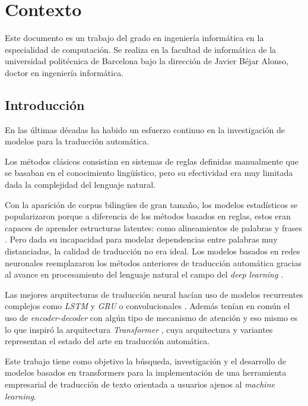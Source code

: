 \chapter{Contexto}
Este documento es un trabajo del grado en ingeniería informática en la especialidad
de computación. Se realiza en la facultad de informática de la universidad politécnica
de Barcelona bajo la dirección de Javier Béjar Alonso, doctor en ingeniería informática.

\section{Introducción}\label{intro}
En las últimas décadas ha habido un esfuerzo continuo en la investigación de modelos para la traducción
automática.

Los métodos clásicos consistian en sistemas de reglas definidas manualmente que se
basaban en el conocimiento lingüístico, pero su efectividad era muy limitada dada la complejidad del lenguaje
natural.

Con la aparición de corpus bilingües de gran tamaño, los modelos estadísticos se popularizaron
porque a diferencia de los métodos basados en reglas, estos eran capaces de aprender
estructuras latentes: como alineamientos de palabras y frases
\cite{HistoryBrown1990ASA, HistoryKoehn2003Jan}. Pero dada su incapacidad para
modelar dependencias entre palabras muy distanciadas, la calidad de traducción no era ideal.
Los modelos basados en redes neuronales \cite{Historykalchbrenner-blunsom-2013, HistoryCho2014Jun,
HistorySutskever2014Sep, HistoryBahdanau2014Sep} reemplazaron los métodos anteriores de
traducción automática gracias al avance en procesamiento del lenguaje natural el campo
del \textit{deep learning} \cite{HistoryTan2020Dec}.

Las mejores arquitecturas de traducción neural hacían uso de modelos recurrentes complejos como
\textit{LSTM} \cite{HistoryHochreiter1997} y \textit{GRU} \cite{HistoryChung2014Dec} o
convolucionales \cite{HistoryGehring2016Nov}. Además tenían en común el uso
de \textit{encoder-decoder} con algún tipo de mecanismo de atención \cite{HistoryBahdanau2014Sep} y
eso mismo es lo que inspiró la arquitectura \textit{Transformer} \cite{Vaswani2017Jun},
cuya arquitectura y variantes representan el estado del arte en traducción automática.

Este trabajo tiene como objetivo la búsqueda, investigación y el desarrollo de modelos
basados en transformers para la implementación de una herramienta
empresarial de traducción de texto orientada a usuarios ajenos al \textit{machine learning}.

